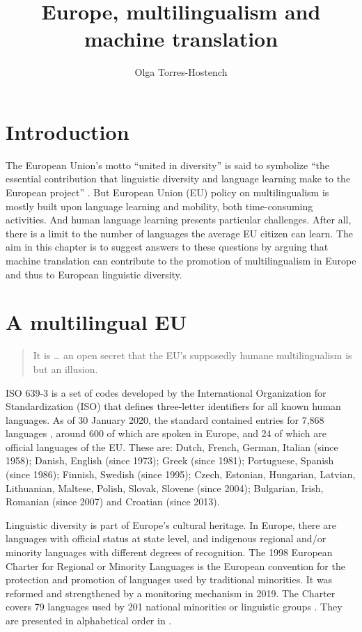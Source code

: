 \documentclass[output=paper]{langscibook}
\author{Olga Torres-Hostench\affiliation{Universitat Autònoma de Barcelona}}
\title{Europe, multilingualism and machine translation}
\begin{document}
\AffiliationsWithoutIndexing{}
\maketitle

\section{Introduction}\largerpage


The European Union's motto “united in diversity” is said to symbolize “the essential contribution that linguistic diversity and language learning make to the European project” \citep{EuropeanCommission2021}. But European Union (EU) policy on multilingualism is mostly built upon language learning and mobility, both time-consuming activities. And human language learning presents particular challenges. After all, there is a limit to the number of languages the average EU citizen can learn. The aim in this chapter is to suggest answers to these questions by arguing that machine translation can contribute to the promotion of multilingualism in Europe and thus to European linguistic diversity.

\section{A multilingual EU}
\begin{quote}
It is … an open secret that the EU’s supposedly humane multilingualism is but an illusion. \citep[561]{House2003}
\end{quote}

ISO 639-3 is a set of codes developed by the International Organization for Standardization (ISO) that defines three-letter identifiers for all known human languages. As of 30 January 2020, the standard contained entries for 7,868 languages \citep{Wikizero2020}, around 600 of which are spoken in Europe, and 24 of which are official languages of the EU. These are: Dutch, French, German, Italian (since 1958); Danish, English (since 1973); Greek (since 1981); Portuguese, Spanish (since 1986); Finnish, Swedish (since 1995); Czech, Estonian, Hungarian, Latvian, Lithuanian, Maltese, Polish, Slovak, Slovene (since 2004); Bulgarian, Irish, Romanian (since 2007) and Croatian (since 2013).

Linguistic diversity is part of Europe’s cultural heritage. In Europe, there are languages with official status at state level, and indigenous regional and/or minority languages with different degrees of recognition. The 1998 European Charter for Regional or Minority Languages is the European convention for the protection and promotion of languages used by traditional minorities. It was reformed and strengthened by a monitoring mechanism in 2019. The Charter covers 79 languages used by 201 national minorities or linguistic groups \citep{CoE2020}. They are presented in alphabetical order in . 
\end{document}
